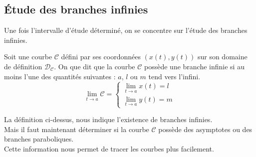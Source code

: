 \subsection{Étude des branches infinies}
Une fois l'intervalle d'étude déterminé, on se concentre sur l'étude des branches infinies.
\begin{defi}
Soit une courbe $\mathscr{C}$ défini par ses coordonnées $(x(t),y(t))$ sur son domaine de définition $\mathscr{D}_\mathscr{C}$. On que dit que la courbe $\mathscr{C}$ possède une branche infinie si au moins l'une des quantités suivantes : $a$, $l$ ou $m$ tend vers l'infini.\\
$$\lim\limits_{t\to a}\mathscr{C}=\begin{cases}\lim\limits_{t\to a}x(t)=l\\\lim\limits_{t\to a}y(t)=m\end{cases}$$
\end{defi}
La définition ci-dessus, nous indique l'existence de branches infinies.\\
Mais il faut maintenant déterminer si la courbe $\mathscr{C}$ possède des asymptotes ou des branches paraboliques.\\
Cette information nous permet de tracer les courbes plus facilement.
